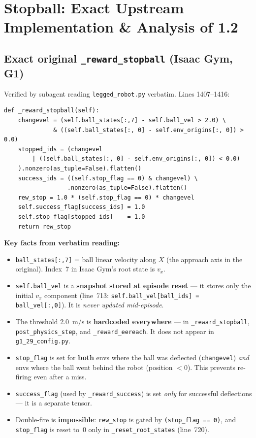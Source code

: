 \documentclass[11pt,a4paper]{article}
\begin{document}
\section{Stopball: Exact Upstream Implementation \& Analysis of 1.2}
\label{sec:stopball_bug}

\subsection{Exact original \texttt{\_reward\_stopball} (Isaac Gym, G1)}

Verified by subagent reading \texttt{legged\_robot.py} verbatim.
Lines 1407--1416:

\begin{lstlisting}[caption={Original stopball reward, legged\_robot.py:1407--1416}]
def _reward_stopball(self):
    changevel = (self.ball_states[:,7] - self.ball_vel > 2.0) \
              & ((self.ball_states[:, 0] - self.env_origins[:, 0]) > 0.0)
    stopped_ids = (changevel
        | ((self.ball_states[:, 0] - self.env_origins[:, 0]) < 0.0)
    ).nonzero(as_tuple=False).flatten()
    success_ids = ((self.stop_flag == 0) & changevel) \
                  .nonzero(as_tuple=False).flatten()
    rew_stop = 1.0 * (self.stop_flag == 0) * changevel
    self.success_flag[success_ids] = 1.0
    self.stop_flag[stopped_ids]    = 1.0
    return rew_stop
\end{lstlisting}

\textbf{Key facts from verbatim reading:}

\begin{itemize}[nosep]
  \item \texttt{ball\_states[:,7]} = ball linear velocity along $X$ (the approach axis
        in the original).  Index~7 in Isaac Gym's root state is $v_x$.
  \item \texttt{self.ball\_vel} is a \textbf{snapshot stored at episode reset} ---
        it stores only the initial $v_x$ component (line~713:
        \texttt{self.ball\_vel[ball\_ids] = ball\_vel[:,0]}). It is \emph{never
        updated mid-episode}.
  \item The threshold 2.0~m/s is \textbf{hardcoded everywhere} --- in
        \texttt{\_reward\_stopball}, \texttt{post\_physics\_step}, and
        \texttt{\_reward\_eereach}. It does not appear in \texttt{g1\_29\_config.py}.
  \item \texttt{stop\_flag} is set for \textbf{both} envs where the ball was
        deflected (\texttt{changevel}) \emph{and} envs where the ball went behind
        the robot (position $< 0$). This prevents re-firing even after a miss.
  \item \texttt{success\_flag} (used by \texttt{\_reward\_success}) is set
        \emph{only} for successful deflections --- it is a separate tensor.
  \item Double-fire is \textbf{impossible}: \texttt{rew\_stop} is gated by
        \texttt{(stop\_flag == 0)}, and \texttt{stop\_flag} is reset to~0
        only in \texttt{\_reset\_root\_states} (line~720).
\end{itemize}
\end{document}
